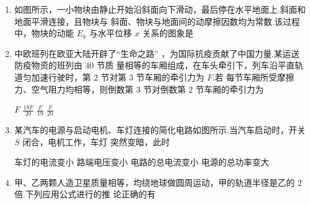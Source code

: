 \begin{enumerate}
\item
如图所示，一小物块由静止开始沿斜面向下滑动，最后停在水平地面上.斜面和地面平滑连接，且物块与
斜面、物块与地面间的动摩擦因数均为常数.该过程中，物块的动能 $ E_{k} $ 与水平位移 $ x $ 关系的图象是  
\begin{figure}[h!]
\centering

\end{figure}

\pfourchoices
{}
{}
{}
{}







\item
中欧班列在欧亚大陆开辟了“生命之路”
，为国际抗疫贡献了中国力量.某运送防疫物资的班列由 $ 40 $ 节质
量相等的车厢组成，在车头牵引下，列车沿平直轨道匀加速行驶时，第 $ 2 $ 节对第 $ 3 $ 节车厢的牵引力为 $ F $.若
每节车厢所受摩擦力、空气阻力均相等，则倒数第 $ 3 $ 节对倒数第 $ 2 $ 节车厢的牵引力为  

\fourchoices
{$F$}
{$\frac{19 F}{20}$}
{$\frac{F}{19}$}
{$\frac{F}{20}$}






\item
某汽车的电源与启动电机、车灯连接的简化电路如图所示.当汽车启动时，开关 $ S $ 闭合，电机工作，车灯
突然变暗，此时 
\begin{figure}[h!]
\centering

\end{figure}


\fourchoices
{车灯的电流变小}
{路端电压变小}
{电路的总电流变小}
{电源的总功率变大}





\item
甲、乙两颗人造卫星质量相等，均绕地球做圆周运动，甲的轨道半径是乙的 $ 2 $ 倍.下列应用公式进行的推
论正确的有  


\end{enumerate}
